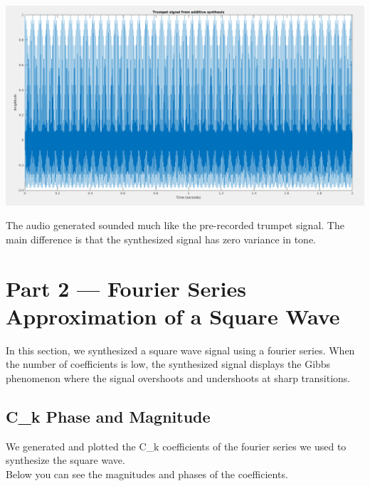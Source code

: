 \documentclass[11pt]{article}
\begin{document}
\begin{framed}
	
\end{framed}

\includegraphics[scale=1.0]{signal_synthesis.png}

The audio generated sounded much like the pre-recorded trumpet signal.
The main difference is that the synthesized signal has zero variance in tone.

\pagebreak
\section{Part 2 --- Fourier Series Approximation of a Square Wave}

In this section, we synthesized a square wave signal using a fourier series.
When the number of coefficients is low, the synthesized signal displays the Gibbs
phenomenon where the signal overshoots and undershoots at sharp transitions.

\subsection{C\_k Phase and Magnitude}

We generated and plotted the C\_k coefficients of the fourier series
we used to synthesize the square wave.\\

Below you can see the magnitudes and phases of the coefficients.
\end{document}

